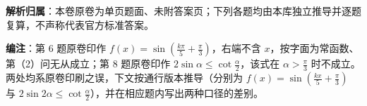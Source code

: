 

\begin{gknotice}
\textbf{解析归属}：本卷原卷为单页题面、未附答案页；下列各题均由本库独立推导并逐题复算，不声称代表官方标准答案。

\textbf{编注}：第 6 题原卷印作 $f(x)=\sin\left(\frac{k\pi}{5}+\frac{\pi}{3}\right)$，右端不含 $x$，按字面为常函数、第（2）问无从成立；第 8 题原卷印作 $2\sin\alpha\leqslant\cot\frac{\alpha}{2}$，该式在 $\alpha>\frac{\pi}{3}$ 时不成立。两处均系原卷印刷之误，下文按通行版本推导（分别为 $f(x)=\sin\left(\frac{kx}{5}+\frac{\pi}{3}\right)$ 与 $2\sin 2\alpha\leqslant\cot\frac{\alpha}{2}$），并在相应题内写出两种口径的差别。
\end{gknotice}

